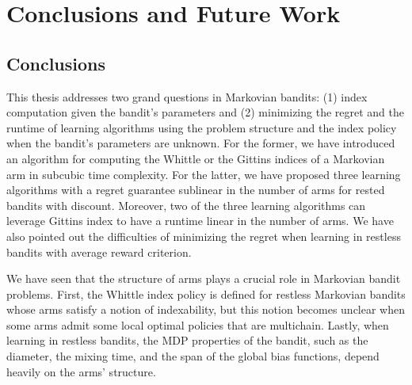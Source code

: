 \begingroup

\let\clearpage\relax

\chapter{Conclusions and Future Work}
\label{chapter:conclusion}

\section{Conclusions}

This thesis addresses two grand questions in Markovian bandits: (1) index computation given the bandit's parameters and (2) minimizing the regret and the runtime of learning algorithms using the problem structure and the index policy when the bandit's parameters are unknown.
For the former, we have introduced an algorithm for computing the Whittle or the Gittins indices of a Markovian arm in subcubic time complexity.
For the latter, we have proposed three learning algorithms with a regret guarantee sublinear in the number of arms for rested bandits with discount.
Moreover, two of the three learning algorithms can leverage Gittins index to have a runtime linear in the number of arms.
We have also pointed out the difficulties of minimizing the regret when learning in restless bandits with average reward criterion.

We have seen that the structure of arms plays a crucial role in Markovian bandit problems.
First, the Whittle index policy is defined for restless Markovian bandits whose arms satisfy a notion of indexability, but this notion becomes unclear when some arms admit some local optimal policies that are multichain.
Lastly, when learning in restless bandits, the MDP properties of the bandit, such as the diameter, the mixing time, and the span of the global bias functions, depend heavily on the arms' structure.

